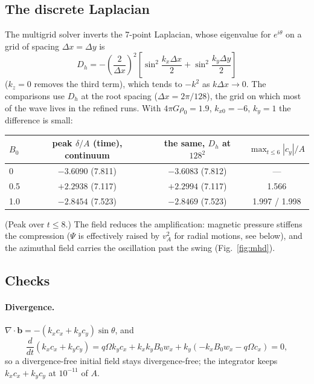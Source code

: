 \documentclass[11pt]{article}
\newcommand{\Om}{\Omega}
\begin{document}
\subsection{The discrete Laplacian}
The multigrid solver inverts the 7-point Laplacian, whose eigenvalue for $e^{i\theta}$ on
a grid of spacing $\Delta x = \Delta y$ is
\begin{equation}
  D_h = -\left(\frac{2}{\Delta x}\right)^2
        \left[\sin^2\frac{k_x\Delta x}{2} + \sin^2\frac{k_y\Delta y}{2}\right]
\end{equation}
($k_z = 0$ removes the third term), which tends to $-k^2$ as $k\Delta x \to 0$. The
comparisons use $D_h$ at the root spacing ($\Delta x = 2\pi/128$), the grid on which most
of the wave lives in the refined runs. With $4\pi G\rho_0 = 1.9$, $k_{x0} = -6$,
$k_y = 1$ the difference is small:

\begin{center}
\small
\begin{tabular}{@{}lccc@{}}
\toprule
$B_0$ & peak $\delta/A$ (time), continuum & the same, $D_h$ at $128^2$ & $\max_{t\le6}|c_y|/A$ \\
\midrule
0   & $-3.6090$ (7.811) & $-3.6083$ (7.812) & --- \\
0.5 & $+2.2938$ (7.117) & $+2.2994$ (7.117) & 1.566 \\
1.0 & $-2.8454$ (7.523) & $-2.8469$ (7.523) & 1.997 / 1.998 \\
\bottomrule
\end{tabular}
\end{center}

\noindent
(Peak over $t \le 8$.) The field reduces the amplification: magnetic pressure stiffens the
compression ($\Psi$ is effectively raised by $v_A^2$ for radial motions, see below), and
the azimuthal field carries the oscillation past the swing (Fig.~\ref{fig:mhd}).

\subsection{Checks}
\paragraph{Divergence.} $\nabla\cdot\mathbf b = -(k_x c_x + k_y c_y)\sin\theta$, and
\[
  \frac{d}{dt}(k_x c_x + k_y c_y) = q\Om k_y c_x + k_x k_y B_0 w_x
     + k_y(-k_x B_0 w_x - q\Om c_x) = 0,
\]
so a divergence-free initial field stays divergence-free; the integrator keeps
$k_x c_x + k_y c_y$ at $10^{-11}$ of $A$.
\end{document}
